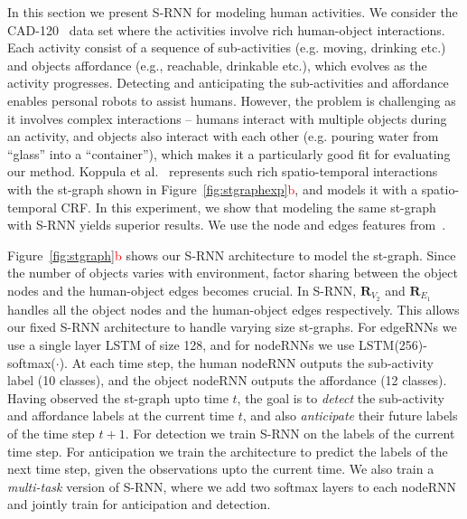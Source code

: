 \documentclass[10pt,twocolumn,letterpaper]{article}
\newcommand{\ve}[1]{\mathbf{#1}}
\newcommand{\rc}[1]{\textcolor{red}{#1}}
\begin{document}
In this section we present S-RNN for modeling human activities. We consider the CAD-120~\cite{Koppula13b} data set where the activities involve rich human-object interactions. Each activity consist of a sequence of sub-activities (e.g. moving, drinking etc.) and  objects affordance (e.g., reachable, drinkable etc.), which evolves as the activity progresses. Detecting and anticipating the sub-activities and affordance enables personal robots to assist humans. However, the problem is challenging as it involves complex interactions -- humans interact with multiple objects during an activity, and  objects  also interact with each other (e.g. pouring water from ``glass'' into a ``container''), which  makes it a particularly good fit for evaluating our method. Koppula et al.~\cite{Koppula13,Koppula13b} represents such rich spatio-temporal interactions with the st-graph shown in Figure~\ref{fig:stgraphexp}\rc{b}, and models it with a spatio-temporal CRF. In this experiment, we show that modeling the same st-graph with S-RNN yields  superior results. We use the node and edges features from~\cite{Koppula13b}.

Figure~\ref{fig:stgraph}\rc{b} shows our S-RNN architecture  to model the st-graph. Since the number of objects varies with environment, factor sharing between the object nodes and the human-object edges becomes crucial. In S-RNN, $\ve{R}_{V_2}$ and $\ve{R}_{E_1}$ handles all the object nodes and the human-object edges respectively. This allows our fixed S-RNN architecture to handle varying size st-graphs. For edgeRNNs we use a single layer LSTM of size 128, and for nodeRNNs we use LSTM(256)-softmax($\cdot$). At each time step, the human nodeRNN outputs the sub-activity label (10 classes), and the object nodeRNN outputs the affordance (12 classes). Having observed the st-graph upto time $t$, the goal is to \textit{detect} the sub-activity and affordance labels at the current time $t$, and also \textit{anticipate} their future labels of the time step $t+1$. For detection  we train S-RNN on the labels of the current time step. For anticipation we train the architecture to predict the labels of the next time step, given the observations upto the current time. We also train a \textit{multi-task} version of S-RNN, where we add two softmax layers to each nodeRNN and jointly train for anticipation and detection.
\end{document}
